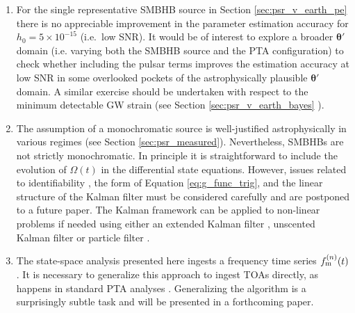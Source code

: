 \documentclass[fleqn,usenatbib,useAMS]{mnras}
\begin{document}
\begin{enumerate}[leftmargin=2em]
		
	\item For the single representative SMBHB source in Section \ref{sec:psr_v_earth_pe} there is no appreciable improvement in the parameter estimation accuracy for $h_0 = 5\times 10^{-15}$ (i.e.\ low SNR). It would be of interest to explore a broader $\boldsymbol{\theta}'$ domain (i.e. varying both the SMBHB source and the PTA configuration) to check whether including the pulsar terms improves the estimation accuracy at low SNR in some overlooked pockets of the astrophysically plausible ${\boldsymbol{\theta}}'$ domain. A similar exercise should be undertaken with respect to the minimum detectable GW strain (see Section \ref{sec:psr_v_earth_bayes}  ). \newline 
	
	\item The assumption of a monochromatic source is well-justified astrophysically in various regimes (see Section \ref{sec:psr_measured}).  Nevertheless, SMBHBs are not strictly monochromatic. In principle it is straightforward to include the evolution of $\Omega(t)$ in the differential state equations. However, issues related to identifiability \citep{e5be7c83a0d24500826f6e1b414d1733}, the form of Equation \eqref{eq:g_func_trig}, and the linear structure of the Kalman filter must be considered carefully and are postponed to a future paper. The Kalman framework can be applied to non-linear problems if needed using either an extended Kalman filter \citep{zarchan2000fundamentals}, unscented Kalman filter \citep{882463van} or particle filter \citep{Simon10}. \newline 
	
	
	\item The state-space analysis presented here ingests a frequency time series $f_{\rm m}^{(n)}(t)$. It is necessary to generalize this approach to ingest TOAs directly, as happens in standard PTA analyses \citep[e.g.][]{Zhupulsarterms,Chen2022,2023ApJ...951L...8A,2023arXiv230616214A,2023ApJ...951L...6R,2023RAA....23g5024X,Arzoumanian2023,2023arXiv230616226A}. Generalizing the algorithm is a surprisingly subtle task and will be presented in a forthcoming paper. \newline
	

\end{enumerate}
\end{document}

